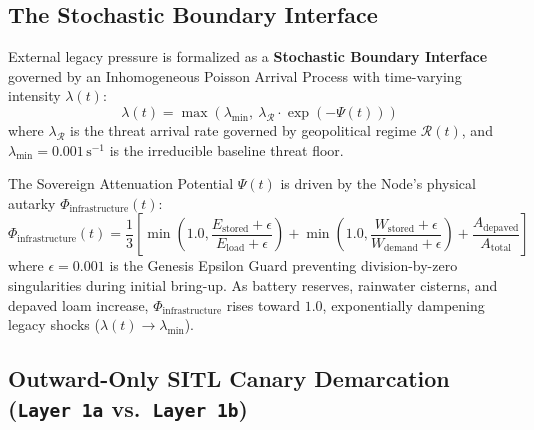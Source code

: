 \subsection{The Stochastic Boundary Interface}

External legacy pressure is formalized as a \textbf{Stochastic Boundary Interface} governed by an Inhomogeneous Poisson Arrival Process with time-varying intensity $\lambda(t)$:
\begin{equation}
\lambda(t) = \max\left(\lambda_{\min}, \ \lambda_{\mathcal{R}} \cdot \exp(-\Psi(t))\right)
\label{eq:poisson_boundary}
\end{equation}
where $\lambda_{\mathcal{R}}$ is the threat arrival rate governed by geopolitical regime $\mathcal{R}(t)$, and $\lambda_{\min} = 0.001\,\mathrm{s}^{-1}$ is the irreducible baseline threat floor.

The Sovereign Attenuation Potential $\Psi(t)$ is driven by the Node's physical autarky $\Phi_{\mathrm{infrastructure}}(t)$:
\begin{equation}
\Phi_{\mathrm{infrastructure}}(t) = \frac{1}{3} \left[ \min\left(1.0, \frac{E_{\mathrm{stored}} + \epsilon}{E_{\mathrm{load}} + \epsilon}\right) + \min\left(1.0, \frac{W_{\mathrm{stored}} + \epsilon}{W_{\mathrm{demand}} + \epsilon}\right) + \frac{A_{\mathrm{depaved}}}{A_{\mathrm{total}}} \right]
\label{eq:autarky_attenuation}
\end{equation}
where $\epsilon = 0.001$ is the Genesis Epsilon Guard preventing division-by-zero singularities during initial bring-up. As battery reserves, rainwater cisterns, and depaved loam increase, $\Phi_{\mathrm{infrastructure}}$ rises toward $1.0$, exponentially dampening legacy shocks ($\lambda(t) \to \lambda_{\min}$).

\subsection{Outward-Only SITL Canary Demarcation (\texttt{Layer 1a} vs.\ \texttt{Layer 1b})}

